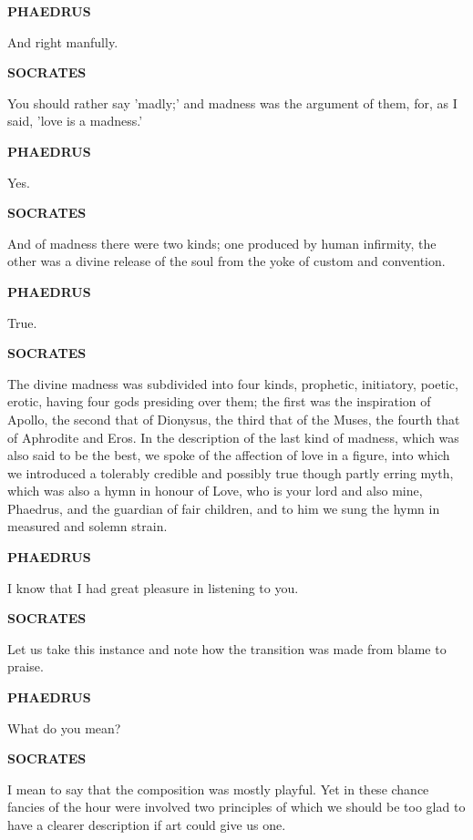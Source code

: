 \documentclass[11pt,letter]{article}
\begin{document}
\par \textbf{PHAEDRUS}
\par   And right manfully.

\par \textbf{SOCRATES}
\par   You should rather say 'madly;' and madness was the argument of them, for, as I said, 'love is a madness.'

\par \textbf{PHAEDRUS}
\par   Yes.

\par \textbf{SOCRATES}
\par   And of madness there were two kinds; one produced by human infirmity, the other was a divine release of the soul from the yoke of custom and convention.

\par \textbf{PHAEDRUS}
\par   True.

\par \textbf{SOCRATES}
\par   The divine madness was subdivided into four kinds, prophetic, initiatory, poetic, erotic, having four gods presiding over them; the first was the inspiration of Apollo, the second that of Dionysus, the third that of the Muses, the fourth that of Aphrodite and Eros. In the description of the last kind of madness, which was also said to be the best, we spoke of the affection of love in a figure, into which we introduced a tolerably credible and possibly true though partly erring myth, which was also a hymn in honour of Love, who is your lord and also mine, Phaedrus, and the guardian of fair children, and to him we sung the hymn in measured and solemn strain.

\par \textbf{PHAEDRUS}
\par   I know that I had great pleasure in listening to you.

\par \textbf{SOCRATES}
\par   Let us take this instance and note how the transition was made from blame to praise.

\par \textbf{PHAEDRUS}
\par   What do you mean?

\par \textbf{SOCRATES}
\par   I mean to say that the composition was mostly playful. Yet in these chance fancies of the hour were involved two principles of which we should be too glad to have a clearer description if art could give us one.
\end{document}

